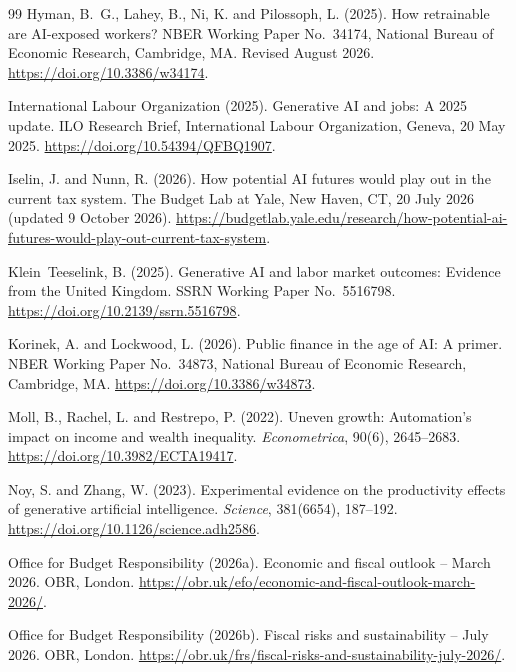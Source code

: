 \begin{thebibliography}{99}
Hyman, B.~G., Lahey, B., Ni, K. and Pilossoph, L. (2025).
\newblock How retrainable are AI-exposed workers?
\newblock NBER Working Paper No.~34174, National Bureau of Economic Research, Cambridge, MA. Revised August 2026.
\newblock \url{https://doi.org/10.3386/w34174}.

International Labour Organization (2025).
\newblock Generative AI and jobs: A 2025 update.
\newblock ILO Research Brief, International Labour Organization, Geneva, 20 May 2025.
\newblock \url{https://doi.org/10.54394/QFBQ1907}.

Iselin, J. and Nunn, R. (2026).
\newblock How potential AI futures would play out in the current tax system.
\newblock The Budget Lab at Yale, New Haven, CT, 20 July 2026 (updated 9 October 2026).
\newblock \url{https://budgetlab.yale.edu/research/how-potential-ai-futures-would-play-out-current-tax-system}.

Klein~Teeselink, B. (2025).
\newblock Generative AI and labor market outcomes: Evidence from the United Kingdom.
\newblock SSRN Working Paper No.~5516798.
\newblock \url{https://doi.org/10.2139/ssrn.5516798}.

Korinek, A. and Lockwood, L. (2026).
\newblock Public finance in the age of AI: A primer.
\newblock NBER Working Paper No.~34873, National Bureau of Economic Research, Cambridge, MA.
\newblock \url{https://doi.org/10.3386/w34873}.

Moll, B., Rachel, L. and Restrepo, P. (2022).
\newblock Uneven growth: Automation's impact on income and wealth inequality.
\newblock \emph{Econometrica}, 90(6), 2645--2683.
\newblock \url{https://doi.org/10.3982/ECTA19417}.

Noy, S. and Zhang, W. (2023).
\newblock Experimental evidence on the productivity effects of generative artificial intelligence.
\newblock \emph{Science}, 381(6654), 187--192.
\newblock \url{https://doi.org/10.1126/science.adh2586}.

Office for Budget Responsibility (2026a).
\newblock Economic and fiscal outlook -- March 2026.
\newblock OBR, London.
\newblock \url{https://obr.uk/efo/economic-and-fiscal-outlook-march-2026/}.

Office for Budget Responsibility (2026b).
\newblock Fiscal risks and sustainability -- July 2026.
\newblock OBR, London.
\newblock \url{https://obr.uk/frs/fiscal-risks-and-sustainability-july-2026/}.


\end{thebibliography}
